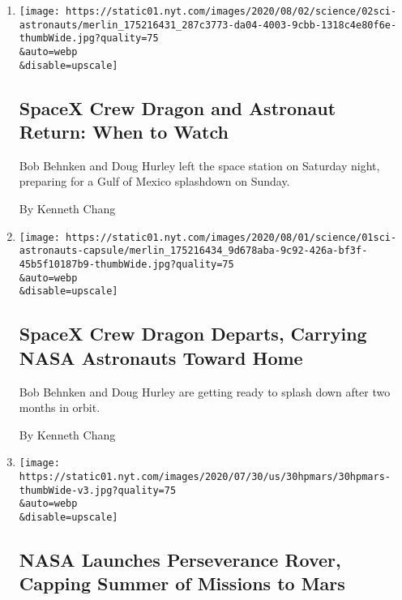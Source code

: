 \begin{enumerate}
\def\labelenumi{\arabic{enumi}.}
\item
  \href{/2020/08/02/science/spacex-nasa-return.html}{}

  \texttt{[image: https://static01.nyt.com/images/2020/08/02/science/02sci-astronauts/merlin\_175216431\_287c3773-da04-4003-9cbb-1318c4e80f6e-thumbWide.jpg?quality=75\\\&auto=webp\\\&disable=upscale]}

  \hypertarget{spacex-crew-dragon-and-astronaut-return-when-to-watch}{%
  \subsection{SpaceX Crew Dragon and Astronaut Return: When to
  Watch}\label{spacex-crew-dragon-and-astronaut-return-when-to-watch}}

  Bob Behnken and Doug Hurley left the space station on Saturday night,
  preparing for a Gulf of Mexico splashdown on Sunday.

  By Kenneth Chang
\item
  \href{/2020/08/01/science/nasa-spacex-astronauts.html}{}

  \texttt{[image: https://static01.nyt.com/images/2020/08/01/science/01sci-astronauts-capsule/merlin\_175216434\_9d678aba-9c92-426a-bf3f-45b5f10187b9-thumbWide.jpg?quality=75\\\&auto=webp\\\&disable=upscale]}

  \hypertarget{spacex-crew-dragon-departs-carrying-nasa-astronauts-toward-home}{%
  \subsection{SpaceX Crew Dragon Departs, Carrying NASA Astronauts
  Toward
  Home}\label{spacex-crew-dragon-departs-carrying-nasa-astronauts-toward-home}}

  Bob Behnken and Doug Hurley are getting ready to splash down after two
  months in orbit.

  By Kenneth Chang
\item
  \href{/2020/07/30/science/nasa-mars-launch.html}{}

  \texttt{[image: https://static01.nyt.com/images/2020/07/30/us/30hpmars/30hpmars-thumbWide-v3.jpg?quality=75\\\&auto=webp\\\&disable=upscale]}

  \hypertarget{nasa-launches-perseverance-rover-capping-summer-of-missions-to-mars}{%
  \subsection{NASA Launches Perseverance Rover, Capping Summer of
  Missions to
  Mars}\label{nasa-launches-perseverance-rover-capping-summer-of-missions-to-mars}}


\end{enumerate}
